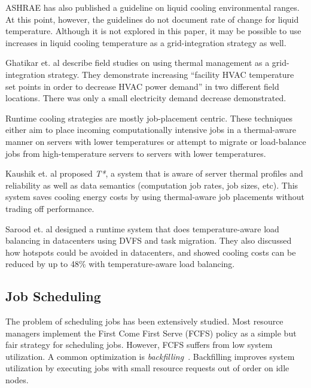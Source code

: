 ASHRAE has also published a guideline on liquid cooling environmental ranges. At this point, however, the guidelines do not document rate of
change for liquid temperature. Although it is not explored in this paper, it
may be possible to use increases in liquid cooling temperature as a
grid-integration strategy as well. 

Ghatikar et. al \cite{Ghatikar2012a} describe field studies on using thermal
management as a grid-integration strategy. They demonstrate increasing ``facility HVAC temperature set points in order to decrease HVAC power
demand” in two different field locations. There was only a small
electricity demand decrease demonstrated.

Runtime cooling strategies are mostly job-placement centric. These techniques
either aim to place incoming computationally intensive jobs in a thermal-aware
manner on servers with lower temperatures or attempt to migrate or load-balance
jobs from high-temperature servers to servers with lower temperatures.

Kaushik et. al \cite{kaushik_t*:_2012} proposed \emph{T*}, a system that is
aware of server thermal profiles and reliability as well as data semantics
(computation job rates, job sizes, etc). This system saves cooling energy costs
by using thermal-aware job placements without trading off performance.

Sarood et. al \cite{SaroodSC11} designed a runtime system that does
temperature-aware load balancing in datacenters using DVFS and task migration.
They also discussed how hotspots could be avoided in datacenters, and showed
cooling costs can be reduced by up to 48\% with temperature-aware load
balancing.

\subsection{Job Scheduling}
The problem of scheduling jobs has been extensively studied. Most resource
managers implement the First Come First Serve (FCFS) policy as a simple but fair
strategy for scheduling jobs. However, FCFS suffers from low system utilization.
A common optimization is \emph{backfilling}~\cite{lifka_anl/ibm_1995,mualem_utilization_2001,feitelson_parallel_2004}.
Backfilling improves system utilization by executing jobs with small resource
requests out of order on idle nodes.

